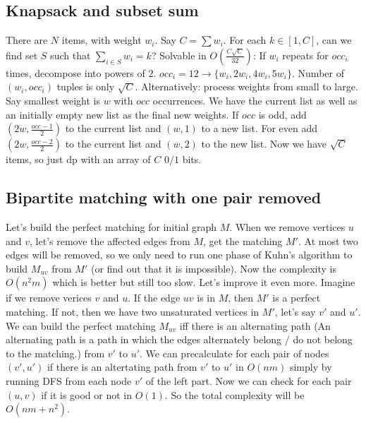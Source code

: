 	\subsection{Knapsack and subset sum}
	There are $N$ items, with weight $w_i$. Say $C=\sum w_i$. For each $k\in [1,C]$, can we find set $S$ such that $\sum_{i\in S}w_i=k$?
	Solvable in $O(\frac{C\sqrt{C}}{32})$: If $w_i$ repeats for $occ_i$ times, decompose into powers of $2$.
	$occ_i=12 \to \{w_i, 2w_i, 4w_i, 5w_i\}$. Number of $(w_i, occ_i)$ tuples is only $\sqrt{C}$.
	Alternatively: process weights from small to large. Say smallest weight is $w$ with $occ$ occurrences. 
	We have the current list as well as an initially empty new list as the final new weights.
	If $occ$ is odd, add $(2w, \frac{occ-1}{2})$ to the current list and $(w, 1)$ to a new list. 
	For even add $(2w, \frac{occ-2}{2})$ to the current list and $(w, 2)$ to the new list.
	Now we have $\sqrt{C}$ items, so just dp with an array of $C$ $0/1$ bits.
	\subsection{Bipartite matching with one pair removed}
	Let's build the perfect matching for initial graph $M$. When we remove vertices $u$ and $v$, let's remove the
	affected edges from $M$, get the matching $M'$. At most two edges will be removed, so we only need to
	run one phase of Kuhn's algorithm to build $M_{uv}$ from $M'$ (or find out that it is impossible). Now the
	complexity is $O(n^2 m)$ which is better but still too slow. Let's improve it even more.
	Imagine if we remove verices $v$ and $u$. If the edge $uv$ is in $M$, then $M'$
	is a perfect matching. If not, then we have two unsaturated vertices in $M'$, let's say $v'$ and $u'$. 
	We can build the perfect matching $M_{uv}$ iff there is an alternating path 
	(An alternating path is a path in which the edges alternately belong / do not belong to the matching.)
	from $v'$ to $u'$. 
	We can precalculate for each pair of nodes $(v', u')$ if there is an
	altertating path from $v'$ to $u'$ in $O(nm)$ simply by running DFS from each node $v'$ of the left part.
	Now we can check for each pair $(u, v)$ if it is good or not in $O(1)$. 
	So the total complexity will be $O(nm + n^2)$.